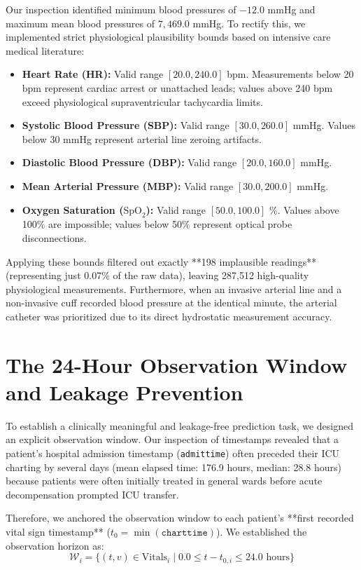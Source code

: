 Our inspection identified minimum blood pressures of $-12.0$ mmHg and maximum mean blood pressures of $7,469.0$ mmHg. To rectify this, we implemented strict physiological plausibility bounds based on intensive care medical literature:
\begin{itemize}
    \item \textbf{Heart Rate (HR):} Valid range $[20.0, 240.0]$ bpm. Measurements below 20 bpm represent cardiac arrest or unattached leads; values above 240 bpm exceed physiological supraventricular tachycardia limits.
    \item \textbf{Systolic Blood Pressure (SBP):} Valid range $[30.0, 260.0]$ mmHg. Values below 30 mmHg represent arterial line zeroing artifacts.
    \item \textbf{Diastolic Blood Pressure (DBP):} Valid range $[20.0, 160.0]$ mmHg.
    \item \textbf{Mean Arterial Pressure (MBP):} Valid range $[30.0, 200.0]$ mmHg.
    \item \textbf{Oxygen Saturation ($\text{SpO}_2$):} Valid range $[50.0, 100.0]$ \%. Values above 100\% are impossible; values below 50\% represent optical probe disconnections.
\end{itemize}

Applying these bounds filtered out exactly **198 implausible readings** (representing just 0.07\% of the raw data), leaving 287,512 high-quality physiological measurements. Furthermore, when an invasive arterial line and a non-invasive cuff recorded blood pressure at the identical minute, the arterial catheter was prioritized due to its direct hydrostatic measurement accuracy.

\section{The 24-Hour Observation Window and Leakage Prevention}
\label{sec:observation_window}

To establish a clinically meaningful and leakage-free prediction task, we designed an explicit observation window. Our inspection of timestamps revealed that a patient's hospital admission timestamp (\texttt{admittime}) often preceded their ICU charting by several days (mean elapsed time: 176.9 hours, median: 28.8 hours) because patients were often initially treated in general wards before acute decompensation prompted ICU transfer.

Therefore, we anchored the observation window to each patient's **first recorded vital sign timestamp** ($t_{0} = \min(\texttt{charttime})$). We established the observation horizon as:
\begin{equation}
\mathcal{W}_i = \{ (t, v) \in \text{Vitals}_i \mid 0.0 \le t - t_{0, i} \le 24.0 \text{ hours} \}
\end{equation}

